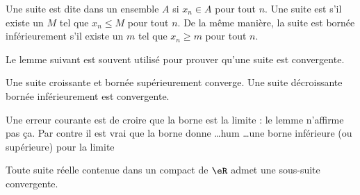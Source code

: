Une suite est dite  dans un ensemble $A$ si $x_n\in A$ pour tout $n$. Une suite est  s'il existe un $M$ tel que $x_n\leq M$ pour tout $n$. De la même manière, la suite est bornée inférieurement s'il existe un $m$ tel que $x_n\geq m$ pour tout $n$.

Le lemme suivant est souvent utilisé pour prouver qu'une suite est convergente.
\begin{lemma}		\label{LemSuiteCrBorncv}
	Une suite croissante et bornée supérieurement converge. Une suite décroissante bornée inférieurement est convergente.
\end{lemma}

Une erreur courante est de croire que la borne est la limite : le lemme n'affirme pas ça. Par contre il est vrai que la borne donne \ldots hum \ldots une borne inférieure (ou supérieure) pour la limite

\begin{theorem}     \label{THOooRDYOooJHLfGq}
	Toute suite réelle contenue dans un compact de \( \eR\) admet une sous-suite convergente.
\end{theorem}

